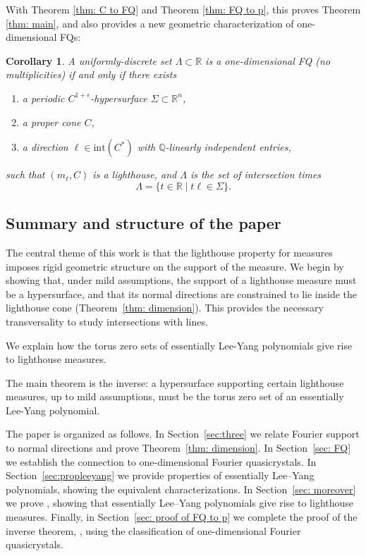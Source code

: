 \documentclass[11pt,letterpaper]{amsart}
\theoremstyle{definition}
\theoremstyle{plain}
\newtheorem{cor}[Def]{Corollary}
\newcommand{\R}{{\mathbb R}}
\newcommand{\Q}{{\mathbb Q}}
\begin{document}
With Theorem \ref{thm: C to FQ} and Theorem \ref{thm: FQ to p}, this proves Theorem \ref{thm: main}, and also provides a new geometric characterization of one-dimensional FQs:
\begin{cor}
   A uniformly-discrete set $\Lambda\subset\R$ is a one-dimensional FQ (no multiplicities) if and only if there exists
   \begin{enumerate}
       \item a periodic $C^{1+\epsilon}$-hypersurface $\Sigma\subset\R^n$,
       \item a proper cone $C$,
       \item a direction $\ell\in\mathrm{int}(C^{*})$ with $\Q$-linearly independent entries,
   \end{enumerate} 
   such that $(m_{\ell},C)$ is a lighthouse, and $\Lambda$ is the set of intersection times $$\Lambda=\{t\in\R\mid t\ell\in\Sigma\}.$$ 
\end{cor}

\subsection{Summary and structure of the paper}
The central theme of this work is that the lighthouse property for measures imposes rigid geometric structure on the support of the measure. 
We begin by showing that, under mild assumptions, the support of a lighthouse 
measure must be a hypersurface, and that its normal directions are constrained 
to lie inside the lighthouse cone (Theorem~\ref{thm: dimension}). This provides 
the necessary transversality to study intersections with lines.

We explain how the torus zero sets of essentially Lee-Yang polynomials give rise to lighthouse measures. 

The main theorem is the inverse: a hypersurface supporting certain lighthouse measures, up to mild assumptions, must be the torus zero set of an essentially Lee-Yang polynomial. 

\medskip

The paper is organized as follows. In Section~\ref{sec:three} we relate Fourier support to 
normal directions and prove Theorem~\ref{thm: dimension}. In Section~\ref{sec: FQ} we establish 
the connection to one-dimensional Fourier quasicrystals. In Section~\ref{sec:propleeyang} we provide properties of essentially Lee--Yang polynomials, showing the 
equivalent characterizations. In Section~\ref{sec: moreover} we prove , 
showing that essentially Lee--Yang polynomials give rise to lighthouse measures. 
Finally, in Section~\ref{sec: proof of FQ to p} we complete the proof of the inverse theorem, , using the 
classification of one-dimensional Fourier quasicrystals.
\end{document}
